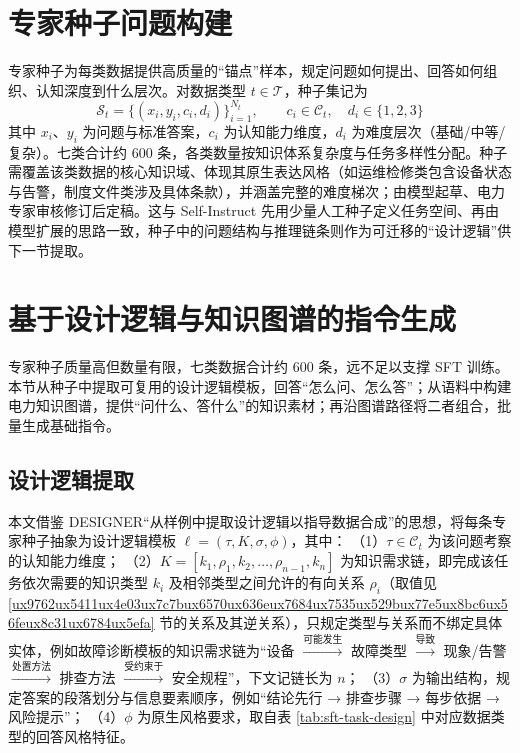 \documentclass[fontset=fandol,type=master,campus=shenzhen,etitleauto=true]{hithesisbook}
\begin{document}
\section{专家种子问题构建}\label{ux4e13ux5bb6ux79cdux5b50ux95eeux9898ux6784ux5efa}

专家种子为每类数据提供高质量的“锚点”样本，规定问题如何提出、回答如何组织、认知深度到什么层次。对数据类型 $t \in \mathcal{T}$，种子集记为
\begin{equation}
\mathcal{S}_t = \{(x_i, y_i, c_i, d_i)\}_{i=1}^{N_t}, \qquad c_i \in \mathcal{C}_t, \quad d_i \in \{1, 2, 3\}
\end{equation}
其中 $x_i$、$y_i$ 为问题与标准答案，$c_i$ 为认知能力维度，$d_i$ 为难度层次（基础/中等/复杂）。七类合计约 600 条，各类数量按知识体系复杂度与任务多样性分配。种子需覆盖该类数据的核心知识域、体现其原生表达风格（如运维检修类包含设备状态与告警，制度文件类涉及具体条款），并涵盖完整的难度梯次；由模型起草、电力专家审核修订后定稿。这与 Self-Instruct 先用少量人工种子定义任务空间、再由模型扩展的思路一致\cite{ref24}，种子中的问题结构与推理链条则作为可迁移的“设计逻辑”\cite{ref54}供下一节提取。

\section{基于设计逻辑与知识图谱的指令生成}\label{ux57faux4e8eux8bbeux8ba1ux903bux8f91ux63d0ux53d6ux4e0eux77e5ux8bc6ux56feux8c31ux7684ux4efbux52a1ux6570ux636eux751fux6210}

专家种子质量高但数量有限，七类数据合计约 600 条，远不足以支撑 SFT 训练。本节从种子中提取可复用的设计逻辑模板，回答“怎么问、怎么答”；从语料中构建电力知识图谱，提供“问什么、答什么”的知识素材；再沿图谱路径将二者组合，批量生成基础指令。

\subsection{设计逻辑提取}\label{ux4eceux4e13ux5bb6ux79cdux5b50ux4e2dux63d0ux53d6ux8bbeux8ba1ux903bux8f91}

本文借鉴 DESIGNER“从样例中提取设计逻辑以指导数据合成”的思想\cite{ref54}，将每条专家种子抽象为设计逻辑模板 $\ell = (\tau, K, \sigma, \phi)$，其中：
（1）$\tau \in \mathcal{C}_t$ 为该问题考察的认知能力维度；
（2）$K = [k_1, \rho_1, k_2, \ldots, \rho_{n-1}, k_n]$ 为知识需求链，即完成该任务依次需要的知识类型 $k_i$ 及相邻类型之间允许的有向关系 $\rho_i$（取值见 \ref{ux9762ux5411ux4e03ux7c7bux6570ux636eux7684ux7535ux529bux77e5ux8bc6ux56feux8c31ux6784ux5efa} 节的关系及其逆关系），只规定类型与关系而不绑定具体实体，例如故障诊断模板的知识需求链为“设备 $\xrightarrow{\text{可能发生}}$ 故障类型 $\xrightarrow{\text{导致}}$ 现象/告警 $\xrightarrow{\text{处置方法}}$ 排查方法 $\xrightarrow{\text{受约束于}}$ 安全规程”，下文记链长为 $n$；
（3）$\sigma$ 为输出结构，规定答案的段落划分与信息要素顺序，例如“结论先行 → 排查步骤 → 每步依据 → 风险提示”；
（4）$\phi$ 为原生风格要求，取自表 \ref{tab:sft-task-design} 中对应数据类型的回答风格特征。
\end{document}
